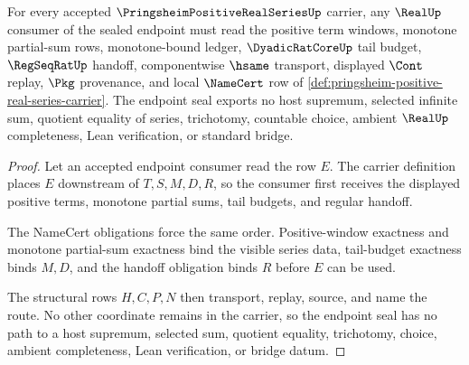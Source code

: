 \begin{theorem}
\label{thm:pringsheim-positive-real-series-real-seal-nonescape}
For every accepted $\PringsheimPositiveRealSeriesUp$ carrier, any $\RealUp$ consumer of the sealed endpoint must read the positive term windows, monotone partial-sum rows, monotone-bound ledger, $\DyadicRatCoreUp$ tail budget, $\RegSeqRatUp$ handoff, componentwise $\hsame$ transport, displayed $\Cont$ replay, $\Pkg$ provenance, and local $\NameCert$ row of \autoref{def:pringsheim-positive-real-series-carrier}. The endpoint seal exports no host supremum, selected infinite sum, quotient equality of series, trichotomy, countable choice, ambient $\RealUp$ completeness, Lean verification, or standard bridge.
\end{theorem}
\begin{proof}
Let an accepted endpoint consumer read the row $E$. The carrier definition places $E$ downstream of $T,S,M,D,R$, so the consumer first receives the displayed positive terms, monotone partial sums, tail budgets, and regular handoff.

The NameCert obligations force the same order. Positive-window exactness and monotone partial-sum exactness bind the visible series data, tail-budget exactness binds $M,D$, and the handoff obligation binds $R$ before $E$ can be used.

The structural rows $H,C,P,N$ then transport, replay, source, and name the route. No other coordinate remains in the carrier, so the endpoint seal has no path to a host supremum, selected sum, quotient equality, trichotomy, choice, ambient completeness, Lean verification, or bridge datum.
\end{proof}



